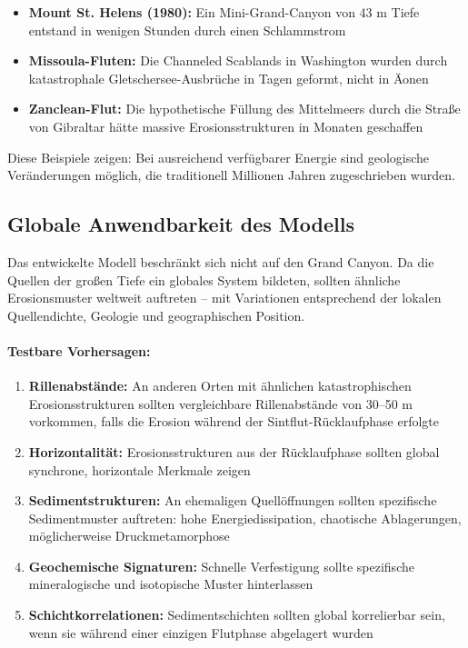 ﻿\documentclass[12pt,a4paper]{report}
\begin{document}
\begin{itemize}
	\item \textbf{Mount St. Helens (1980):} Ein \glqq Mini-Grand-Canyon\grqq{} von 43 m Tiefe entstand in wenigen Stunden durch einen Schlammstrom
	
	\item \textbf{Missoula-Fluten:} Die Channeled Scablands in Washington wurden durch katastrophale Gletschersee-Ausbrüche in Tagen geformt, nicht in Äonen
	
	\item \textbf{Zanclean-Flut:} Die hypothetische Füllung des Mittelmeers durch die Straße von Gibraltar hätte massive Erosionsstrukturen in Monaten geschaffen
\end{itemize}

Diese Beispiele zeigen: Bei ausreichend verfügbarer Energie sind geologische Verän\-derungen möglich, die traditionell Millionen Jahren zugeschrieben wurden.

\subsection{Globale Anwendbarkeit des Modells}

Das entwickelte Modell beschränkt sich nicht auf den Grand Canyon. Da die Quellen der großen Tiefe ein globales System bildeten, sollten ähnliche Erosionsmuster weltweit auftreten -- mit Variationen entsprechend der lokalen Quellendichte, Geologie und geographischen Position.

\paragraph{Testbare Vorhersagen:}

\begin{enumerate}
	\item \textbf{Rillenabstände:} An anderen Orten mit ähnlichen katastrophischen Erosionsstrukturen sollten vergleichbare Rillenabstände von 30--50 m vorkommen, falls die Erosion während der Sintflut-Rücklaufphase erfolgte
	
	\item \textbf{Horizontalität:} Erosionsstrukturen aus der Rücklaufphase sollten global synchrone, horizontale Merkmale zeigen
	
	\item \textbf{Sedimentstrukturen:} An ehemaligen Quellöffnungen sollten spezifische Sedimentmuster auftreten: hohe Energiedissipation, chaotische Ablagerungen, möglicherweise Druckmetamorphose
	
	\item \textbf{Geochemische Signaturen:} Schnelle Verfestigung sollte spezifische mineralogische und isotopische Muster hinterlassen
	
	\item \textbf{Schichtkorrelationen:} Sedimentschichten sollten global korrelierbar sein, wenn sie während einer einzigen Flutphase abgelagert wurden
\end{enumerate}
\end{document}
